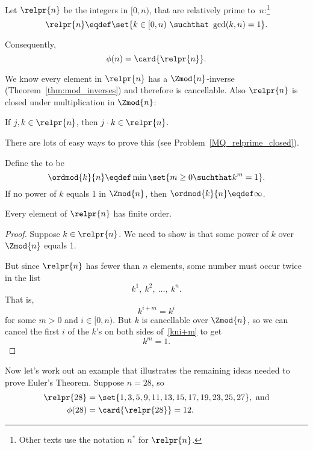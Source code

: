 \begin{definition}
Let $\relpr{n}$  be the integers in $[0, n)$, that are relatively
  prime to~$n$:\footnote{Other texts use the notation $n^*$ for
  $\relpr{n}$.}
\begin{equation}\label{def:relpr}
\relpr{n} \eqdef \set{k \in [0,n)\ \suchthat\ \gcd(k,n) = 1}.
\end{equation}
\end{definition}
Consequently,
\[
\phi(n) = \card{\relpr{n}}.
\]

We know every element in $\relpr{n}$ has a $\Zmod{n}$-inverse
(Theorem~\ref{thm:mod_inverses}) and therefore is cancellable.  Also
$\relpr{n}$ is closed under multiplication in $\Zmod{n}$:
\begin{lemma}\label{relprimgroup}
If $j,k \in \relpr{n}$, then $j \cdot k \in \relpr{n}$.
\end{lemma}
There are lots of easy ways to prove this (see
Problem~\ref{MQ_relprime_closed}).

\begin{definition}
Define the \index{order over $\Zmod{n}$}{\term{order} of $k \in [0,n)$
    over $\Zmod{n}$} to be
\[
\ordmod{k}{n} \eqdef \min \set{m \geq 0 \suchthat k^m = 1}.
\]
If no power of $k$ equals 1 in $\Zmod{n}$, then $\ordmod{k}{n} \eqdef
\infty$.
\end{definition}

\begin{lemma}\label{relprime_order}
Every element of $\relpr{n}$ has finite order.

\begin{proof}
Suppose $k \in \relpr{n}$.  We need to show is that some power of $k$
over $\Zmod{n}$ equals 1.

But since $\relpr{n}$ has fewer than $n$ elements, some number must
occur twice in the list
\[
k^1,\ k^2,\ \dots,\ k^n.
\] 
That is,
\begin{equation}\label{kni+m}
k^{i+m} = k^{i}
\end{equation}
for some $m >0$ and $i \in [0,n)$.  But $k$ is cancellable over
  $\Zmod{n}$, so we can cancel the first $i$ of the $k$'s on both
  sides of~\eqref{kni+m} to get
\[
k^m =1.
\]
\end{proof}
\end{lemma}

Now let's work out an example that illustrates the remaining ideas
needed to prove Euler's Theorem.  Suppose $n=28$, so
\begin{align}
\relpr{28} & = \set{1, 3, 5, 9, 11, 13, 15, 17, 19, 23, 25, 27},\text{
  and} \label{gcd128}\\
\phi(28) & = \card{\relpr{28}} = 12. \notag
\end{align}


